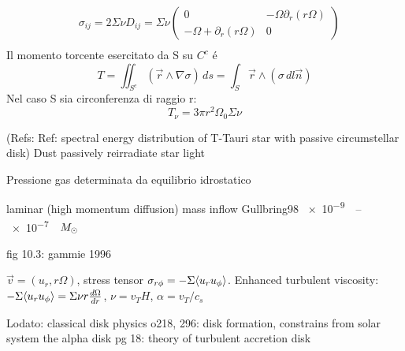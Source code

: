 \begin{workout}
	\begin{align}
		&\sigma_{ij}=2\Sigma\nu D_{ij}=\Sigma\nu\begin{pmatrix}0&-\Omega\partial_r(r\Omega)\\-\Omega+\partial_r(r\Omega)&0
		\end{pmatrix}\\
	\end{align}
	Il momento torcente esercitato da S su $C^c$ \'e
	\begin{equation}
	T=\iint_{S^c}(\vec{r}\wedge\nabla\sigma)\,ds=\int_S\vec{r}\wedge(\sigma\,dl\vec{n})
	\end{equation}
	Nel caso S sia circonferenza di raggio r:
	\begin{equation}
	T_{\nu}=3\pi r^2\Omega_0\Sigma\nu
	\end{equation}
\end{workout}

\begin{workout}
	(Refs: Ref: spectral energy distribution of T-Tauri star with passive circumstellar disk)
	Dust passively reirradiate star light
\end{workout}

\begin{workout}
	Pressione gas determinata da equilibrio idrostatico
\end{workout}

\begin{workout}
	laminar (high momentum diffusion)
	mass inflow Gullbring98 \SIrange{e-9}{e-7}{\per\year}$M_{\odot}{}$
\end{workout}
\begin{workout}[MRI]
	fig 10.3:
	gammie 1996
\end{workout}

\begin{workout}
	$\vec{v}=(u_r,r\Omega)$, stress tensor $\sigma_{r\phi}=-\Sigma\langle u_ru_{\phi} \rangle$.
	Enhanced turbulent viscosity: $-\Sigma\langle u_ru_{\phi} \rangle=\Sigma\nu r\frac{d \Omega}{d r}$, $\nu=v_TH$, $\alpha=v_T/c_s$
\end{workout}

\begin{workout}
	Lodato: classical disk physics
	o218, 296: disk formation, constrains from solar system
	the alpha disk pg 18: theory of turbulent accretion disk
\end{workout}

